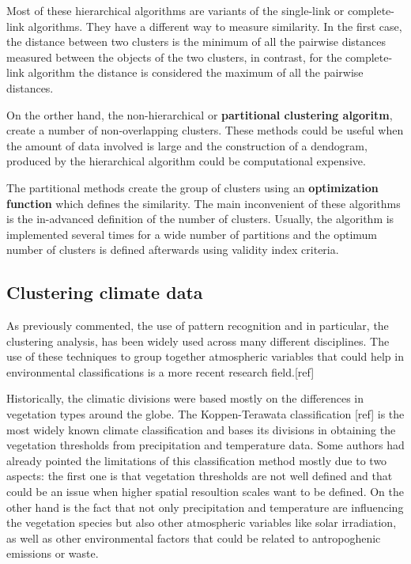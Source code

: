 Most of these hierarchical algorithms are variants of the single-link or complete-link algorithms. They have a different way to measure similarity. In the first case, the distance between two clusters is the minimum of all the pairwise distances measured between the objects of the two clusters, in contrast, for the complete-link algorithm the distance is considered the maximum of all the pairwise distances.

On the orther hand, the non-hierarchical or \textbf{partitional clustering algoritm}, create a number of non-overlapping clusters. These methods could be useful when the amount of data involved is large and the construction of a dendogram, produced by the hierarchical algorithm could be computational expensive.

The partitional methods create the group of clusters using an \textbf{optimization function} which defines the similarity. The main inconvenient of these algorithms is the in-advanced definition of the number of clusters. Usually, the algorithm is implemented several times for a wide number of partitions and the optimum number of clusters is defined afterwards using validity index criteria.



\subsection{Clustering climate data}

As previously commented, the use of pattern recognition and in particular, the clustering analysis, has been widely used across many different disciplines. The use of these techniques to group together atmospheric variables that could help in environmental classifications is a more recent research field.[ref]

Historically, the climatic divisions were based mostly on the differences in vegetation types around the globe. The Koppen-Terawata classification [ref] is the most widely known climate classification and bases its divisions in obtaining the vegetation thresholds from precipitation and temperature data. Some authors had already pointed the limitations of this classification method mostly due to two aspects: the first one is that vegetation thresholds are not well defined and that could be an issue when higher spatial resoultion scales want to be defined. On the other hand is the fact that not only precipitation and temperature are influencing the vegetation species but also other atmospheric variables like solar irradiation, as well as other environmental factors that could be related to antropoghenic emissions or waste.

